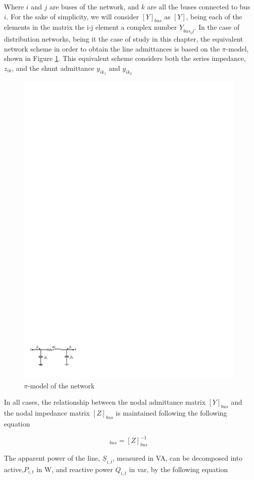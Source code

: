 Where $i$ and $j$ are buses of the network, and $k$ are all the buses connected to bus $i$. For the sake of simplicity, we will consider $[Y]_{bus}$ as $[Y]$, being each of the elements in the matrix the i-j element a complex number $\underline{Y}_{bus_ij}$. In the case of distribution networks, being it the case of study in this chapter, the equivalent network scheme in order to obtain the line admittances is based on the $\pi$-model, shown in Figure \ref{fig:pimodel}. This equivalent scheme considers both the series impedance, $z_{ik}$, and the shunt admittance $y_{ik_1}$ and $y_{ik_2}$ 

\begin{figure}[]
	\centering
	\includegraphics[width=0.7\columnwidth ]{ChapterOPF_DSO/Figures/pimodel2.pdf}
		\caption{$\pi$-model of the network}
	\label{fig:pimodel}  
\end{figure}

In all cases, the relationship between the nodal admittance matrix  $[Y]_{bus}$ and the nodal impedance matrix  $[Z]_{bus}$ is maintained following the following equation 

\begin{equation}
[Y]_{bus} = [Z]_{bus}^{-1}
\end{equation}


The apparent power of the line, $\underline{S}_{i,t}$, measured in VA, can be decomposed into active,$P_{i,t}$ in W, and reactive power $Q_{i,t}$ in var, by the following equation 

